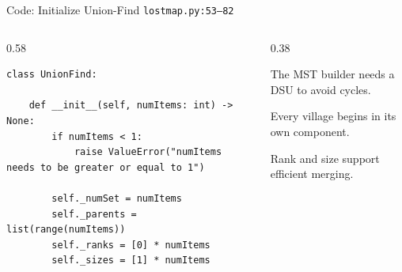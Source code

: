 \documentclass[aspectratio=169,11pt]{beamer}
\begin{document}
\begin{frame}[fragile]{Code: Initialize Union-Find}
\scriptsize
{} \texttt{lostmap.py:53--82}

\vspace{0.08cm}
\begin{columns}[T,totalwidth=\textwidth]
\begin{column}{0.58\textwidth}
\begin{lstlisting}[style=cpcode]
class UnionFind:

    def __init__(self, numItems: int) -> None:
        if numItems < 1:
            raise ValueError("numItems needs to be greater or equal to 1")

        self._numSet = numItems
        self._parents = list(range(numItems))
        self._ranks = [0] * numItems
        self._sizes = [1] * numItems
\end{lstlisting}
\end{column}
\begin{column}{0.38\textwidth}
\begin{tightitemize}
  \item The MST builder needs a DSU to avoid cycles.
  \item Every village begins in its own component.
  \item Rank and size support efficient merging.
\end{tightitemize}
\end{column}
\end{columns}
\end{frame}
\end{document}
